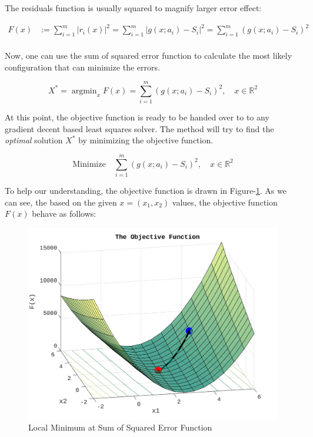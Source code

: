 \documentclass[a4paper]{report}
\numberwithin{figure}{section}
\newcommand{\argmin}{\mathop{\mathrm{argmin}}}
\newcommand{\R}{\mathbb{R}}
\begin{document}
The residuals function is usually squared to magnify larger error effect:

\begin{equation}
\begin{aligned}
F(x) & := \sum_{i=1}^{m} \vert r_i(x) \vert^2 = 
\sum_{i=1}^{m} \vert g(x;a_i) - S_i \vert^2 =
\sum_{i=1}^{m} (g(x;a_i) - S_i)^2 \\
\label{eq}
\end{aligned}
\end{equation}

Now, one can use the sum of squared error function to calculate the most likely
configuration that can minimize the errors. 

\begin{equation}
X^* = \argmin_x F(x) = 
\sum_{i=1}^{m} (g(x;a_i) - S_i)^2, 
\quad x \in \R^2
\label{eq}
\end{equation}

At this point, the objective function is ready to be handed over to 
to any gradient decent based least squares solver. The method will try to find the
\textit{optimal} solution $X^*$ by minimizing the objective function.

\begin{equation}
\text{Minimize} \quad \sum_{i=1}^{m} (g(x;a_i) - S_i)^2, 
\quad x \in \R^2
\label{eq}
\end{equation}

To help our understanding, the objective function is drawn in
Figure-\ref{fig:lsq_sum_of_squared_error_function}.
As we can see, the based on the given $x=(x_1,x_2)$ values, 
the objective
function $F(x)$ behave as follows:

\begin{figure}[H]
	\centering
	\includegraphics[width=\linewidth,natwidth=640,natheight=640]
	{fig/lsq_sum_of_squared_error_function_v2.jpg}
	\caption{Local Minimum at Sum of Squared Error Function}
	\label{fig:lsq_sum_of_squared_error_function}
\end{figure}
\end{document}
